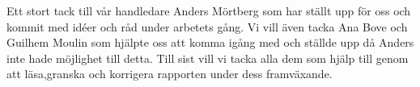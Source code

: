 Ett stort tack till  vår handledare Anders Mörtberg som har ställt upp för oss
och kommit med idéer och råd  under arbetets gång.
Vi vill även tacka Ana Bove och Guilhem Moulin
som hjälpte oss att komma igång med \coq och ställde upp då Anders inte hade
möjlighet till detta.
Till sist vill vi tacka alla dem som hjälp till genom att läsa,granska och
korrigera rapporten under dess framväxande.